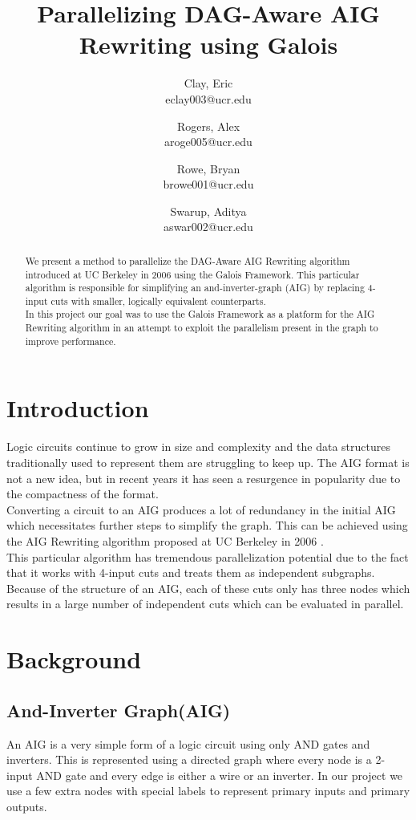 \documentclass[twocolumn]{article}
\title{\huge{Parallelizing DAG-Aware AIG Rewriting using Galois}}
\date{\vspace{-5ex}}
\author{
  Clay, Eric\\
  eclay003@ucr.edu
  \and
  Rogers, Alex\\
  aroge005@ucr.edu
  \and
  Rowe, Bryan\\
  browe001@ucr.edu
  \and
  Swarup, Aditya\\
  aswar002@ucr.edu
}
\begin{document}
\maketitle

\begin{abstract}
We present a method to parallelize the DAG-Aware AIG Rewriting algorithm introduced at UC Berkeley in 2006 \cite{DAG} using the Galois Framework\cite{GALOIS}.  This particular algorithm is responsible for simplifying an and-inverter-graph (AIG) by replacing 4-input cuts with smaller, logically equivalent counterparts.  \\\indent
In this project our goal was to use the Galois Framework\cite{GALOIS} as a platform for the AIG Rewriting algorithm in an attempt to exploit the parallelism present in the graph to improve performance.
\end{abstract}

\section{Introduction}
Logic circuits continue to grow in size and complexity and the data structures traditionally used to represent them are struggling to keep up. The AIG format is not a new idea, but in recent years it has seen a resurgence in popularity due to the compactness of the format.\\\indent
Converting a circuit to an AIG produces a lot of redundancy in the initial AIG which necessitates further steps to simplify the graph. This can be achieved using the AIG Rewriting algorithm proposed at UC Berkeley in 2006 \cite{DAG}.  \\\indent
This particular algorithm has tremendous parallelization potential due to the fact that it works with 4-input cuts and treats them as independent subgraphs. Because of the structure of an AIG, each of these cuts only has three nodes which results in a large number of independent cuts which can be evaluated in parallel.

\section{Background}
\subsection{And-Inverter Graph(AIG)}
An AIG is a very simple form of a logic circuit using only AND gates and inverters. This is represented using a directed graph where every node is a 2-input AND gate and every edge is either a wire or an inverter. In our project we use a few extra nodes with special labels to represent primary inputs and primary outputs.
\end{document}
